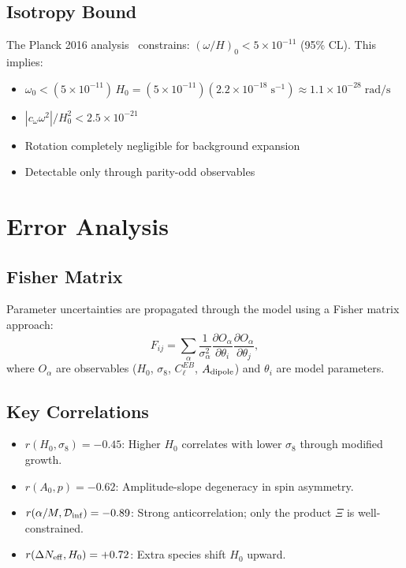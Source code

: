 \documentclass[aps,prd,twocolumn,superscriptaddress,showpacs,preprintnumbers,nofootinbib,longbibliography,floatfix]{revtex4-2}
\newcommand{\Dinf}{\mathcal{D}_{\rm inf}}
\newcommand{\Neff}{N_{\rm eff}}
\begin{document}
\subsection{Isotropy Bound}

The Planck 2016 analysis~\cite{Saadeh2016} constrains: $(\omega/H)_0 < 5\times 10^{-11}$ (95\% CL). This implies:
\begin{itemize}[leftmargin=*]
\item $\omega_0 < (5\times 10^{-11})\,H_0 = (5\times 10^{-11})(2.2\times 10^{-18}\;\text{s}^{-1}) \approx 1.1\times 10^{-28}\;\text{rad/s}$
\item $|c_\omega\omega^2|/H_0^2 < 2.5\times 10^{-21}$
\item Rotation completely negligible for background expansion
\item Detectable only through parity-odd observables
\end{itemize}


\section{Error Analysis}\label{app:errors}

\subsection{Fisher Matrix}

Parameter uncertainties are propagated through the model using a Fisher matrix approach:
\begin{equation}
F_{ij}=\sum_\alpha\frac{1}{\sigma_\alpha^2}\frac{\partial O_\alpha}{\partial\theta_i}\frac{\partial O_\alpha}{\partial\theta_j},
\end{equation}
where $O_\alpha$ are observables ($H_0$, $\sigma_8$, $C_\ell^{EB}$, $A_{\rm dipole}$) and $\theta_i$ are model parameters.

\subsection{Key Correlations}

\begin{itemize}[leftmargin=*]
\item $r(H_0,\sigma_8) = -0.45$: Higher $H_0$ correlates with lower $\sigma_8$ through modified growth.
\item $r(A_0,p) = -0.62$: Amplitude-slope degeneracy in spin asymmetry.
\item $r(\alpha/M,\Dinf) = -0.89$: Strong anticorrelation; only the product $\Xi$ is well-constrained.
\item $r(\Delta\Neff,H_0) = +0.72$: Extra species shift $H_0$ upward.
\end{itemize}
\end{document}
